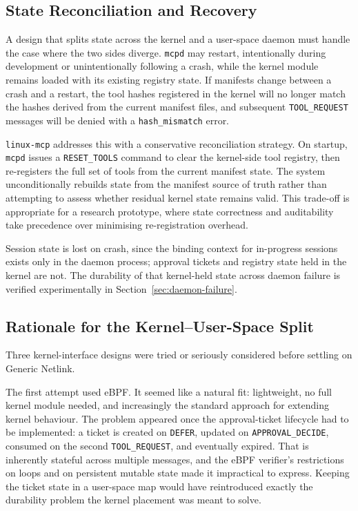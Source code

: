 \subsection{State Reconciliation and Recovery}
\label{sec:reconciliation}

A design that splits state across the kernel and a user-space daemon must handle the case where the two sides diverge.
\texttt{mcpd} may restart, intentionally during development or unintentionally following a crash, while the kernel module remains loaded with its existing registry state.
If manifests change between a crash and a restart, the tool hashes registered in the kernel will no longer match the hashes derived from the current manifest files, and subsequent \texttt{TOOL\_REQUEST} messages will be denied with a \texttt{hash\_mismatch} error.

\texttt{linux-mcp} addresses this with a conservative reconciliation strategy.
On startup, \texttt{mcpd} issues a \texttt{RESET\_TOOLS} command to clear the kernel-side tool registry, then re-registers the full set of tools from the current manifest state.
The system unconditionally rebuilds state from the manifest source of truth rather than attempting to assess whether residual kernel state remains valid.
This trade-off is appropriate for a research prototype, where state correctness and auditability take precedence over minimising re-registration overhead.

Session state is lost on crash, since the binding context for in-progress sessions exists only in the daemon process; approval tickets and registry state held in the kernel are not.
The durability of that kernel-held state across daemon failure is verified experimentally in Section~\ref{sec:daemon-failure}.



\subsection{Rationale for the Kernel--User-Space Split}
\label{sec:design-alternatives}

Three kernel-interface designs were tried or seriously considered before settling on Generic Netlink.

The first attempt used eBPF.
It seemed like a natural fit: lightweight, no full kernel module needed, and increasingly the standard approach for extending kernel behaviour.
The problem appeared once the approval-ticket lifecycle had to be implemented: a ticket is created on \texttt{DEFER}, updated on \texttt{APPROVAL\_DECIDE}, consumed on the second \texttt{TOOL\_REQUEST}, and eventually expired.
That is inherently stateful across multiple messages, and the eBPF verifier's restrictions on loops and on persistent mutable state made it impractical to express.
Keeping the ticket state in a user-space map would have reintroduced exactly the durability problem the kernel placement was meant to solve.


